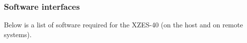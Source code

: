 \subsubsection{Software interfaces}

Below is a list of software required for the XZES-40 (on the host and on remote systems).

